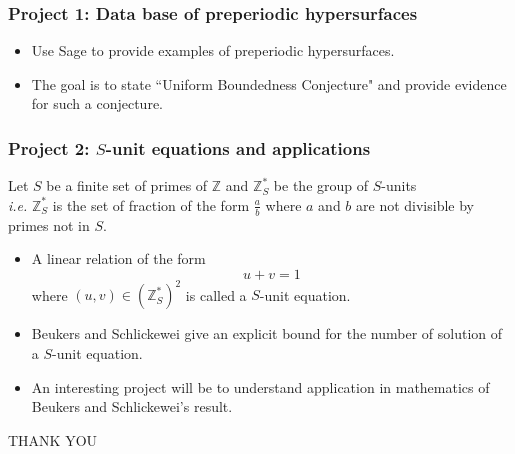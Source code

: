 \documentclass{beamer}
\def\jump{ \quad \\ \vspace{0.7cm} \pause}
\def\ZZ{{\mathbb Z}}
\theoremstyle{thmstyle}
\theoremstyle{thmstyle}
\theoremstyle{thmstyle}
\theoremstyle{mystyle}
\theoremstyle{qstnstyle}
\begin{document}
\begin{frame}
\frametitle{Project 1: Data base of preperiodic hypersurfaces}
\begin{itemize}
\item Use Sage to provide examples of preperiodic hypersurfaces.
\jump
\item The goal is to state ``Uniform Boundedness Conjecture"  and provide evidence for such a conjecture. 
\end{itemize}
 
\end{frame}


\begin{frame}
\frametitle{Project 2: $S$-unit equations and applications}
Let $S$ be a finite set of primes of $\ZZ$ and $\ZZ_S^{*}$ be the group of $S$-units \\ \textit{i.e.} $\ZZ_S^{*}$ is the set of fraction of the form $\displaystyle\frac{a}{b}$ where $a$ and $b$ are not divisible by primes not in $S$.\pause

\begin{itemize}

\item A linear relation of the form $$u+v=1$$  where  $(u,v) \in \left(\ZZ_S^*\right)^2$ is called a $S$-unit equation. \pause
\item Beukers and Schlickewei give an explicit bound  for the number of solution of a $S$-unit equation.\pause
\item An interesting project will be to understand application in mathematics of Beukers and Schlickewei's result.
\end{itemize}
\end{frame}







\begin{frame}
\Huge{THANK YOU}
\end{frame}
\end{document}
